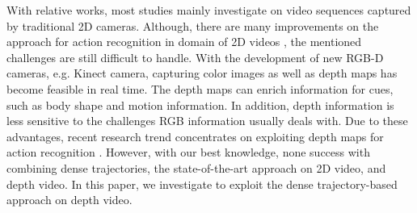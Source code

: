 \documentclass[final,3p,times,twocolumn]{elsarticle}
\begin{document}
With relative works, most studies mainly investigate on video sequences captured by traditional 2D cameras.
Although, there are many improvements on the approach for action recognition in domain of 2D videos \cite{jain2013better, wang2013action}, the mentioned challenges are still difficult to handle.
With the development of new RGB-D cameras, e.g. Kinect camera, capturing color images as well as depth maps has become feasible in real time.
The depth maps can enrich information for cues, such as body shape and motion information.
In addition, depth information is less sensitive to the challenges RGB information usually deals with.
Due to these advantages, recent research trend concentrates on exploiting depth maps for action recognition \cite{li2010action, wang2012mining, vieira2012stop, yang2012eigenjoints, yang2012recognizing, wang2012robust, xia2013spatio, oreifej2013hon4d}.
However, with our best knowledge, none success with combining dense trajectories, the state-of-the-art approach on 2D video, and depth video.
In this paper, we investigate to exploit the dense trajectory-based approach on depth video.
\end{document}
